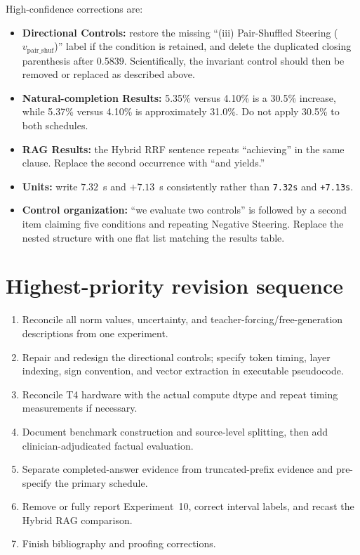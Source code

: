 \documentclass[11pt]{article}
\begin{document}
High-confidence corrections are:

\begin{itemize}
 \item \textbf{Directional Controls:} restore the missing ``(iii) Pair-Shuffled Steering ($v_{\text{pair\_shuf}}$)'' label if the condition is retained, and delete the duplicated closing parenthesis after 0.5839.  Scientifically, the invariant control should then be removed or replaced as described above.
 \item \textbf{Natural-completion Results:} 5.35\% versus 4.10\% is a 30.5\% increase, while 5.37\% versus 4.10\% is approximately 31.0\%.  Do not apply 30.5\% to both schedules.
 \item \textbf{RAG Results:} the Hybrid RRF sentence repeats ``achieving'' in the same clause.  Replace the second occurrence with ``and yields.''
 \item \textbf{Units:} write $7.32$~s and $+7.13$~s consistently rather than \texttt{7.32s} and \texttt{+7.13s}.
 \item \textbf{Control organization:} ``we evaluate two controls'' is followed by a second item claiming five conditions and repeating Negative Steering.  Replace the nested structure with one flat list matching the results table.
\end{itemize}

\section*{Highest-priority revision sequence}

\begin{enumerate}
 \item Reconcile all norm values, uncertainty, and teacher-forcing/free-generation descriptions from one experiment.
 \item Repair and redesign the directional controls; specify token timing, layer indexing, sign convention, and vector extraction in executable pseudocode.
 \item Reconcile T4 hardware with the actual compute dtype and repeat timing measurements if necessary.
 \item Document benchmark construction and source-level splitting, then add clinician-adjudicated factual evaluation.
 \item Separate completed-answer evidence from truncated-prefix evidence and pre-specify the primary schedule.
 \item Remove or fully report Experiment~10, correct interval labels, and recast the Hybrid RAG comparison.
 \item Finish bibliography and proofing corrections.
\end{enumerate}
\end{document}
